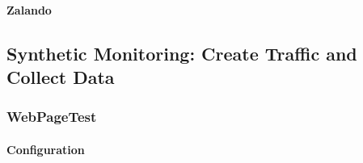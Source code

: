 



\paragraph{Zalando}











\subsection{Synthetic Monitoring: Create Traffic and Collect Data}





\subsubsection{WebPageTest}





\paragraph{Configuration}

